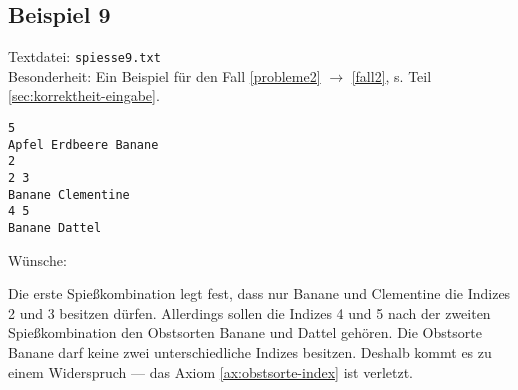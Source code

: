 \newpage
\subsection{Beispiel 9}\label{example:9}
Textdatei: \texttt{spiesse9.txt}\\
Besonderheit: Ein Beispiel für den Fall \ref{probleme2} $\rightarrow$ \ref{fall2}, s. Teil \ref{sec:korrektheit-eingabe}.
\begin{verbatim}
5
Apfel Erdbeere Banane
2
2 3
Banane Clementine
4 5
Banane Dattel
\end{verbatim}

\noindent
Wünsche: 
\vspace{0.25cm}

\noindent
{}
\vspace{0.25cm}

Die erste Spießkombination legt fest, dass nur Banane und Clementine die Indizes 2 und 3 besitzen dürfen.
Allerdings sollen die Indizes 4 und 5 nach der zweiten Spießkombination den Obstsorten Banane und Dattel 
gehören. Die Obstsorte Banane darf keine zwei unterschiedliche Indizes besitzen.
Deshalb kommt es zu einem Widerspruch --- das Axiom \ref{ax:obstsorte-index} ist verletzt.